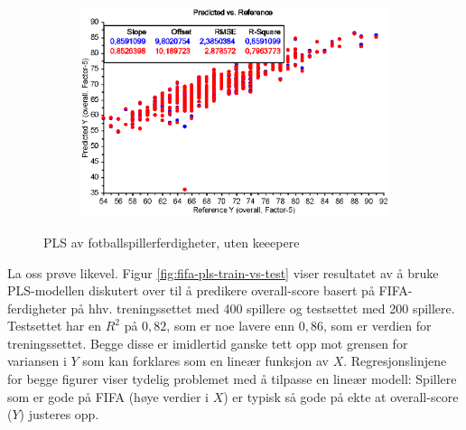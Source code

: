 \begin{figure}[h]
\begin{subfigure}[t]{0.48\textwidth}
 		\caption{}
 		\label{}
 	\end{subfigure}
 	\begin{subfigure}[t]{0.48\textwidth}
 		\centering
 		\includegraphics[width=\textwidth]{figurer/fifa-pls-pvsr}
 		\caption{}
 		\label{}
 	\end{subfigure}
	\label{fig:fifa-pls}
	\caption{PLS av fotballspillerferdigheter, uten keeepere}
 \end{figure}

 La oss prøve likevel. Figur \ref{fig:fifa-pls-train-vs-test} viser resultatet av å bruke PLS-modellen diskutert over til å predikere overall-score basert på FIFA-ferdigheter på hhv. treningssettet med 400 spillere og testsettet med 200 spillere. Testsettet har en $R^2$ på $0,82$, som er noe lavere enn $0,86$, som er verdien for treningssettet. Begge disse er imidlertid ganske tett opp mot grensen for variansen i $Y$ som kan forklares som en lineær funksjon av $X$. Regresjonslinjene for begge figurer viser tydelig problemet med å tilpasse en lineær modell: Spillere som er gode på FIFA (høye verdier i $X$) er typisk så gode på ekte at overall-score ($Y$) justeres opp.

